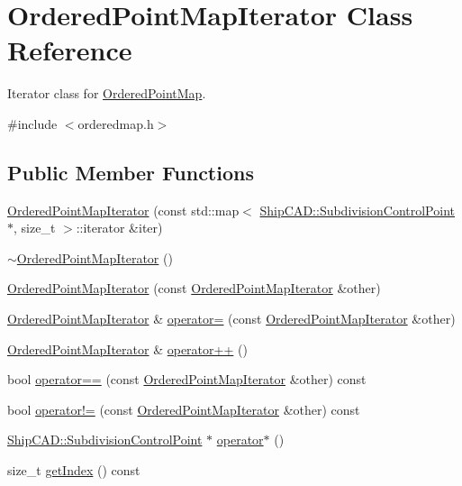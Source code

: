 \hypertarget{classOrderedPointMapIterator}{}\section{Ordered\+Point\+Map\+Iterator Class Reference}
\label{classOrderedPointMapIterator}


Iterator class for \hyperlink{classOrderedPointMap}{Ordered\+Point\+Map}.  




{\ttfamily \#include $<$orderedmap.\+h$>$}

\subsection*{Public Member Functions}
\begin{DoxyCompactItemize}
\item 
\hyperlink{classOrderedPointMapIterator_acac924de32a36c7763d05f1fb197f77f}{Ordered\+Point\+Map\+Iterator} (const std\+::map$<$ \hyperlink{classShipCAD_1_1SubdivisionControlPoint}{Ship\+C\+A\+D\+::\+Subdivision\+Control\+Point} $\ast$, size\+\_\+t $>$\+::iterator \&iter)
\item 
\hyperlink{classOrderedPointMapIterator_a3bfaa63180e91597177dbd90c4463a9f}{$\sim$\+Ordered\+Point\+Map\+Iterator} ()
\item 
\hyperlink{classOrderedPointMapIterator_ad60424e1ca4bb814f69bb0b5c2c455e6}{Ordered\+Point\+Map\+Iterator} (const \hyperlink{classOrderedPointMapIterator}{Ordered\+Point\+Map\+Iterator} \&other)
\item 
\hyperlink{classOrderedPointMapIterator}{Ordered\+Point\+Map\+Iterator} \& \hyperlink{classOrderedPointMapIterator_a6c8d7a8455ad7c14117eb4ed15be341b}{operator=} (const \hyperlink{classOrderedPointMapIterator}{Ordered\+Point\+Map\+Iterator} \&other)
\item 
\hyperlink{classOrderedPointMapIterator}{Ordered\+Point\+Map\+Iterator} \& \hyperlink{classOrderedPointMapIterator_a4afb8fa2199d493a3f262e0cc0fbd9d5}{operator++} ()
\item 
bool \hyperlink{classOrderedPointMapIterator_a95913ce995a2778fb0a777ba1e4515f5}{operator==} (const \hyperlink{classOrderedPointMapIterator}{Ordered\+Point\+Map\+Iterator} \&other) const 
\item 
bool \hyperlink{classOrderedPointMapIterator_ab01092ab7421731c2207709849cc9269}{operator!=} (const \hyperlink{classOrderedPointMapIterator}{Ordered\+Point\+Map\+Iterator} \&other) const 
\item 
\hyperlink{classShipCAD_1_1SubdivisionControlPoint}{Ship\+C\+A\+D\+::\+Subdivision\+Control\+Point} $\ast$ \hyperlink{classOrderedPointMapIterator_a4b475c1342c415674fe9411f1debcb91}{operator$\ast$} ()
\item 
size\+\_\+t \hyperlink{classOrderedPointMapIterator_a86ab7660a91176915ce8a4237bdc4213}{get\+Index} () const 
\end{DoxyCompactItemize}



